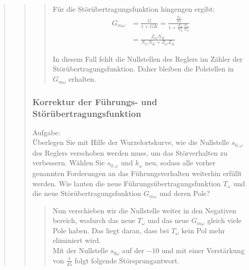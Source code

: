 \begin{quote}
\begin{quote}
\begin{quote}
            Für die Störübertragungsfunktion hingengen ergibt:
            \begin{equation*}
            	\begin{split}
            		G_{m\omega} &= \frac{G}{1 + GK} = \frac{\frac{Z_G}{N_G}}{1 + \frac{Z_K}{N_K}\frac{Z_G}{N_G}}\\
            		&= \frac{Z_G N_K}{N_G N_K + Z_G Z_K}
            	\end{split}
            \end{equation*}
            
            In diesem Fall fehlt die Nullstellen des Reglers im Zähler der Störübertragungsfunktion. Daher bleiben die
            Polstellen in $G_{m\omega}$ erhalten.
            
                        
		\end{quote}
		
		\subsubsection{Korrektur der Führungs- und Störübertragungsfunktion}
		\label{2f}
		Aufgabe:\\
	    Überlegen Sie mit Hilfe der Wurzelortskurve, wie die Nullstelle $s_{0,\omega}$ des Reglers verschoben werden muss, um
	    das Störverhalten zu verbessern. Wählen Sie $s_{0,\omega}$ und $k_\omega$ neu, sodass alle vorher genannten
	    Forderungen an das Führungsverhalten weiterhin erfüllt werden. Wie lauten die neue
	    Führungsübertragungsfunktion $T_\omega$ und die neue Störübertragungsfunktion $G_{m\omega}$ und deren Pole?
		\begin{quote}
		\vspace{1em}
			Nun verschieben wir die Nullstelle weiter in den Negativen bereich, wodurch das neue $T_\omega$ und das
			neue $G_{m\omega}$ gleich viele Pole haben. Das liegt daran, dass bei $T_\omega$ kein Pol mehr eliminiert wird.\\
			Mit der Nullstelle $s_{0\omega}$ auf der $-10$ und mit einer Verstärkung
			von $\frac{1}{45}$ folgt folgende Störsprungantwort.
			

\end{quote}
\end{quote}
\end{quote}
